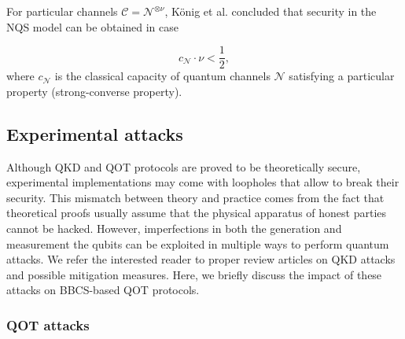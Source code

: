 



For particular channels $\mathcal{C} = \mathcal{N}^{\otimes \nu }$, K\"onig et al. \cite{KWW12} concluded that security in the NQS model can be obtained in case

$$c_{\mathcal{N}} \cdot \nu < \frac{1}{2},$$
where $c_{\mathcal{N}}$ is the classical capacity of quantum channels $\mathcal{N}$ satisfying a particular property (strong-converse property).




\subsection{Experimental attacks}

Although QKD and QOT protocols are proved to be theoretically secure, experimental implementations may come with loopholes that allow to break their security. This mismatch between theory and practice comes from the fact that theoretical proofs usually assume that the physical apparatus of honest parties cannot be hacked. However, imperfections in both the generation and measurement the qubits can be exploited in multiple ways to perform quantum attacks. We refer the interested reader to proper review articles \cite{LCT14, Pirandola2020} on QKD attacks and possible mitigation measures. Here, we briefly discuss the impact of these attacks on BBCS-based QOT protocols.

\subsubsection{QOT attacks}

